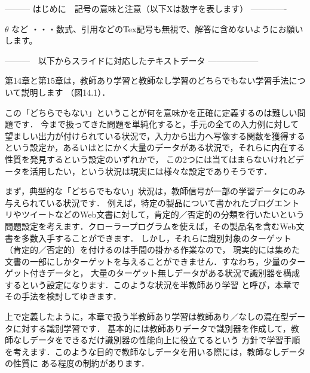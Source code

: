 --------- はじめに　記号の意味と注意（以下Xは数字を表します） -------------

$\theta$ など       ・・・数式、引用などのTex記号も無視で、解答に含めないようにお願いします。
\cite{mitchell97}

---------　以下からスライドに対応したテキストデータ ------------------



第14章と第15章は，教師あり学習と教師なし学習のどちらでもない学習手法について説明します
（図14.1）．


この「どちらでもない」ということが何を意味かを正確に定義するのは難しい問題です．
今まで扱ってきた問題を単純化すると，手元の全ての入力例に対して望ましい出力が付けられている状況で，入力から出力へ写像する関数を獲得するという設定か，あるいはとにかく大量のデータがある状況で，それらに内在する性質を発見するという設定のいずれかで，
この2つには当てはまらないけれどデータを活用したい，という状況は現実には様々な設定でありそうです．

まず，典型的な「どちらでもない」状況は，教師信号が一部の学習データにのみ与えられている状況です．
例えば，特定の製品について書かれたブログエントリやツイートなどのWeb文書に対して，肯定的／否定的の分類を行いたいという
問題設定を考えます．クローラープログラムを使えば，その製品名を含むWeb文書を多数入手することができます．
しかし，それらに識別対象のターゲット（肯定的／否定的）を付けるのは手間の掛かる作業なので，
現実的には集めた文書の一部にしかターゲットを与えることができません．すなわち，少量のターゲット付きデータと，
大量のターゲット無しデータがある状況で識別器を構成するという設定になります．このような状況を半教師あり学習
と呼び，本章でその手法を検討してゆきます．



上で定義したように，本章で扱う半教師あり学習は教師あり／なしの混在型データに対する識別学習です．
基本的には教師ありデータで識別器を作成して，教師なしデータをできるだけ識別器の性能向上に役立てるという
方針で学習手順を考えます．このような目的で教師なしデータを用いる際には，教師なしデータの性質に
ある程度の制約があります．



